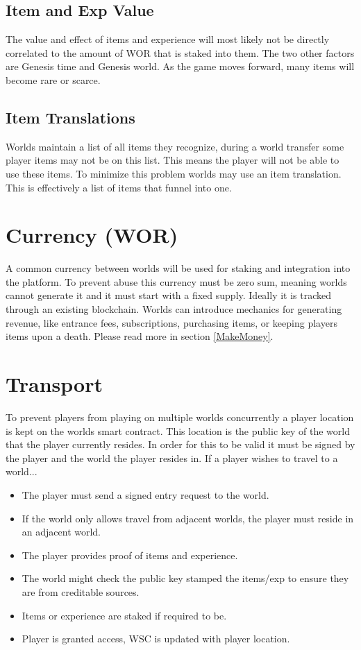 \documentclass[runningheads,a4paper]{llncs}
\begin{document}
\subsection{Item and Exp Value}
The value and effect of items and experience will most likely not be directly correlated to the amount of WOR that is staked into them. The two other factors are Genesis time and Genesis world. As the game moves forward, many items will become rare or scarce.

\subsection{Item Translations}
\label{ItemTranslations}
Worlds maintain a list of all items they recognize, during a world transfer some player items may not be on this list. This means the player will not be able to use these items. To minimize this problem worlds may use an item translation. This is effectively a list of items that funnel into one. 

\section{Currency (WOR)}
\label{money}
A common currency between worlds will be used for staking and integration into the platform. To prevent abuse this currency must be zero sum, meaning worlds cannot generate it and it must start with a fixed supply. Ideally it is tracked through an existing blockchain. Worlds can introduce mechanics for generating revenue, like entrance fees, subscriptions, purchasing items, or keeping players items upon a death. Please read more in section \ref{MakeMoney}.

\section{Transport}
To prevent players from playing on multiple worlds concurrently a player location is kept on the worlds smart contract. This location is the public key of the world that the player currently resides. In order for this to be valid it must be signed by the player and the world the player resides in. If a player wishes to travel to a world... 

\begin{itemize}
\item{The player must send a signed entry request to the world.}
\item{If the world only allows travel from adjacent worlds, the player must reside in an adjacent world.}
\item{The player provides proof of items and experience.}
\item{The world might check the public key stamped the items/exp to ensure they are from creditable sources.}
\item{Items or experience are staked if required to be.}
\item{Player is granted access, WSC is updated with player location.}
\end{itemize}
\end{document}
